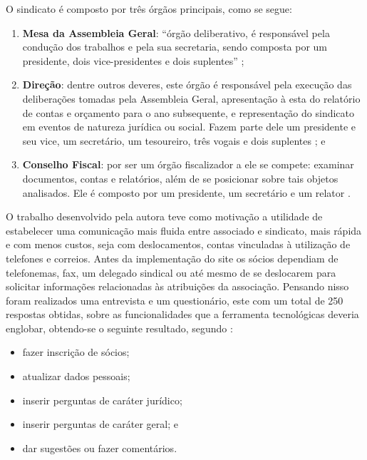 O sindicato é composto por três órgãos principais, como se segue:

\begin{enumerate}
 \item \textbf{Mesa da Assembleia Geral}: ``órgão deliberativo, é responsável pela condução dos trabalhos e pela sua secretaria, sendo composta por um presidente, dois vice-presidentes e dois suplentes'' ;
 \item \textbf{Direção}: dentre outros deveres, este órgão é responsável pela execução das deliberações tomadas pela Assembleia Geral, apresentação à esta do relatório de contas e orçamento para o ano subsequente, e representação do sindicato em eventos de natureza jurídica ou social. Fazem parte dele um presidente e seu vice, um secretário, um tesoureiro, três vogais e dois suplentes ; e
 \item \textbf{Conselho Fiscal}: por ser um órgão fiscalizador a ele se compete: examinar documentos, contas e relatórios, além de se posicionar sobre tais objetos analisados. Ele é composto por um presidente, um secretário e um relator . 
\end{enumerate}

O trabalho desenvolvido pela autora teve como motivação a utilidade de estabelecer uma comunicação mais fluida entre associado e sindicato, mais rápida e com menos custos, seja com deslocamentos, contas vinculadas à utilização de telefones e correios. Antes da implementação do site os sócios dependiam de telefonemas, fax, um delegado sindical ou até mesmo de se deslocarem para solicitar informações relacionadas às atribuições da associação. Pensando nisso foram realizados uma entrevista e um questionário, este com um total de 250 respostas obtidas, sobre as funcionalidades que a ferramenta tecnológicas deveria englobar, obtendo-se o seguinte resultado, segundo :

\begin{itemize}
 \item fazer inscrição de sócios;
 \item atualizar dados pessoais;
 \item inserir perguntas de caráter jurídico;
 \item inserir perguntas de caráter geral; e
 \item dar sugestões ou fazer comentários.
\end{itemize}

